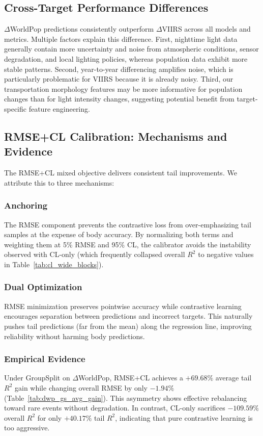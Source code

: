 \documentclass[11pt,conference,onecolumn]{IEEEtran}
\begin{document}
\subsection{Cross-Target Performance Differences}

$\Delta$WorldPop predictions consistently outperform $\Delta$VIIRS across all models and metrics. Multiple factors explain this difference. First, nighttime light data generally contain more uncertainty and noise from atmospheric conditions, sensor degradation, and local lighting policies, whereas population data exhibit more stable patterns. Second, year-to-year differencing amplifies noise, which is particularly problematic for VIIRS because it is already noisy. Third, our transportation morphology features may be more informative for population changes than for light intensity changes, suggesting potential benefit from target-specific feature engineering.

\subsection{RMSE+CL Calibration: Mechanisms and Evidence}

The RMSE+CL mixed objective delivers consistent tail improvements. We attribute this to three mechanisms:

\subsubsection{Anchoring}
The RMSE component prevents the contrastive loss from over-emphasizing tail samples at the expense of body accuracy. By normalizing both terms and weighting them at 5\% RMSE and 95\% CL, the calibrator avoids the instability observed with CL-only (which frequently collapsed overall $R^2$ to negative values in Table~\ref{tab:cl_wide_blocks}).

\subsubsection{Dual Optimization}
RMSE minimization preserves pointwise accuracy while contrastive learning encourages separation between predictions and incorrect targets. This naturally pushes tail predictions (far from the mean) along the regression line, improving reliability without harming body predictions.

\subsubsection{Empirical Evidence}
Under GroupSplit on $\Delta$WorldPop, RMSE+CL achieves a $+69.68\%$ average tail $R^2$ gain while changing overall RMSE by only $-1.94\%$ (Table~\ref{tab:dwp_gs_avg_gain}). This asymmetry shows effective rebalancing toward rare events without degradation. In contrast, CL-only sacrifices $-109.59\%$ overall $R^2$ for only $+40.17\%$ tail $R^2$, indicating that pure contrastive learning is too aggressive.
\end{document}
